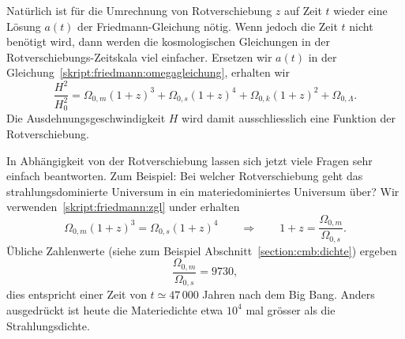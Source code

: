 Natürlich ist für die Umrechnung von Rotverschiebung $z$ auf Zeit $t$
wieder eine Lösung $a(t)$ der Friedmann-Gleichung nötig.
Wenn jedoch die Zeit $t$ nicht benötigt wird, dann werden die
kosmologischen Gleichungen in der Rotverschiebungs-Zeitskala
viel einfacher.
Ersetzen wir $a(t)$ in der Gleichung~\eqref{skript:friedmann:omegagleichung},
erhalten wir
\begin{equation}
\frac{H^2}{H_0^2}
=
\Omega_{0,m}(1+z)^3
+
\Omega_{0,s}(1+z)^4
+
\Omega_{0,k}(1+z)^2
+
\Omega_{0,\Lambda}.
\label{skript:friedmann:zgl}
\end{equation}
Die Ausdehnungsgeschwindigkeit $H$ wird damit ausschliesslich eine
Funktion der Rotverschiebung.

In Abhängigkeit von der Rotverschiebung lassen sich jetzt viele Fragen
sehr einfach beantworten.
Zum Beispiel: Bei welcher Rotverschiebung geht das strahlungsdominierte
Universum in ein materiedominiertes Universum über?
Wir verwenden~\eqref{skript:friedmann:zgl} under erhalten
\[
\Omega_{0,m}(1+z)^3 = \Omega_{0,s}(1+z)^4
\qquad\Rightarrow\qquad
1+z
=
\frac{\Omega_{0,m}}{\Omega_{0,s}}.
\]
Übliche Zahlenwerte (siehe zum Beispiel Abschnitt~\ref{section:cmb:dichte})
ergeben
\begin{equation}
\frac{\Omega_{0,m}}{\Omega_{0,s}} = 9730,
\label{skript:friedmann:msequal}
\end{equation}
dies entspricht einer Zeit von $t\simeq 47\,000$ Jahren nach dem Big Bang.
Anders ausgedrückt ist heute die Materiedichte etwa $10^4$ mal grösser
als die Strahlungsdichte.



